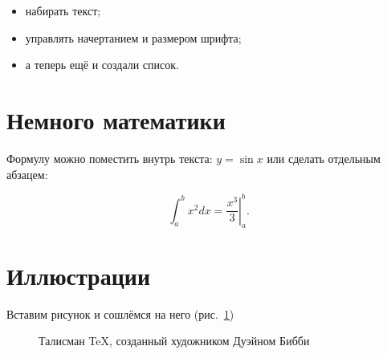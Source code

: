 \documentclass[12pt]{article}
\begin{document}
\begin{itemize}
\item набирать текст;
\item управлять начертанием и размером шрифта;
\item а теперь ещё и создали список.
\end{itemize}

\section{Немного математики}

Формулу можно поместить внутрь текста: \( y=\sin x \) или сделать отдельным абзацем:

\[
\int_a^b x^2 dx = \left. \frac{x^3}{3} \right|_a^b .
\]

\section{Иллюстрации}

Вставим рисунок и сошлёмся на него (рис.~\ref{lion})

\begin{figure}[h]
\caption{Талисман \TeX, созданный художником Дуэйном Бибби}
\label{lion}
\end{figure}
\end{document}

